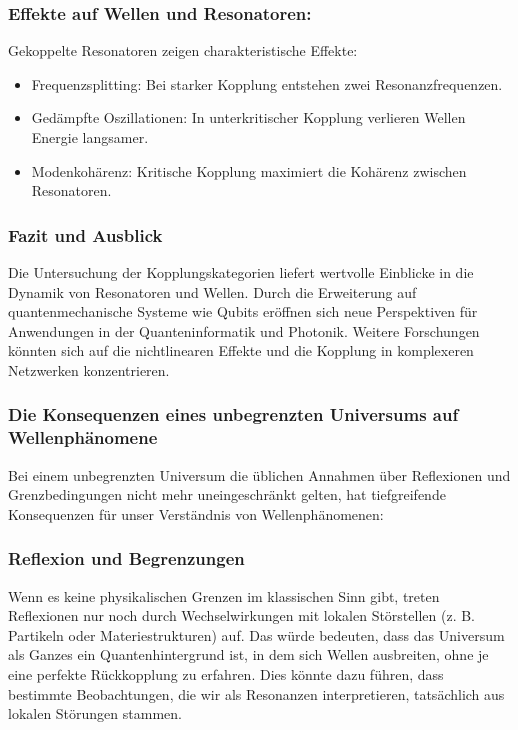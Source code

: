 \documentclass[12pt,a4paper]{article}
\begin{document}
	\subsubsection{Effekte auf Wellen und Resonatoren:}
	Gekoppelte Resonatoren zeigen charakteristische Effekte:
	\begin{itemize}
		\item Frequenzsplitting: Bei starker Kopplung entstehen zwei Resonanzfrequenzen.
		\item Gedämpfte Oszillationen: In unterkritischer Kopplung verlieren Wellen Energie langsamer.
		\item Modenkohärenz: Kritische Kopplung maximiert die Kohärenz zwischen Resonatoren.
	\end{itemize}
	
	\subsubsection{Fazit und Ausblick}
	Die Untersuchung der Kopplungskategorien liefert wertvolle Einblicke in die Dynamik von Resonatoren und Wellen. Durch die Erweiterung auf quantenmechanische Systeme wie Qubits eröffnen sich neue Perspektiven für Anwendungen in der Quanteninformatik und Photonik. Weitere Forschungen könnten sich auf die nichtlinearen Effekte und die Kopplung in komplexeren Netzwerken konzentrieren.
	
	\subsubsection{Die Konsequenzen eines unbegrenzten Universums auf Wellenphänomene}
	
	Bei einem unbegrenzten Universum die üblichen Annahmen über Reflexionen und Grenzbedingungen nicht mehr uneingeschränkt gelten, hat tiefgreifende Konsequenzen für unser Verständnis von Wellenphänomenen:
	
	\subsubsection{Reflexion und Begrenzungen}
	Wenn es keine physikalischen Grenzen im klassischen Sinn gibt, treten Reflexionen nur noch durch Wechselwirkungen mit lokalen Störstellen (z. B. Partikeln oder Materiestrukturen) auf. Das würde bedeuten, dass das Universum als Ganzes ein Quantenhintergrund ist, in dem sich Wellen ausbreiten, ohne je eine perfekte Rückkopplung zu erfahren. Dies könnte dazu führen, dass bestimmte Beobachtungen, die wir als Resonanzen interpretieren, tatsächlich aus lokalen Störungen stammen.
	
\end{document}
